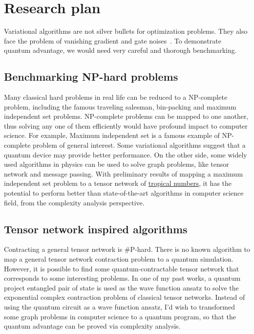 \documentclass[aps,longbibliography,english,superscriptaddress]{revtex4-1}
\begin{document}
\section{Research plan}
Variational algorithms are not silver bullets for optimization problems. They also face the problem of vanishing gradient and gate noises~\cite{McClean2018}.
To demonstrate quantum advantage, we would need very careful and thorough benchmarking.

\subsection{Benchmarking NP-hard problems}
Many classical hard problems in real life can be reduced to a NP-complete problem, including the famous traveling salesman, bin-packing and maximum independent set problems. NP-complete problems can be mapped to one another, thus solving any one of them efficiently would have profound impact to computer science.
For example, Maximum independent set is a famous example of NP-complete problem of general interest. Some variational algorithms suggest that a quantum device may provide better performance.
On the other side, some widely used algorithms in physics can be used to solve graph problems, like tensor network and message passing.
With preliminary results of mapping a maximum independent set problem to a tensor network of \href{https://en.wikipedia.org/wiki/Tropical\_geometry}{tropical numbers}, it has the potential to perform better than state-of-the-art algorithms in computer science field, from the complexity analysis perspective.

\subsection{Tensor network inspired algorithms}
Contracting a general tensor network is \#P-hard.
There is no known algorithm to map a general tensor network contraction problem to a quantum simulation.
However, it is possible to find some quantum-contractable tensor network that corresponds to some interesting problems.
In one of my past works, a quantum project entangled pair of state is used as the wave function ansatz to solve the exponential complex contraction problem of classical tensor networks.
Instead of using the quantum circuit as a wave function ansatz, I'd wish to transformed some graph problems in computer science to a quantum program, so that the quantum advantage can be proved via complexity analysis.
\end{document}
